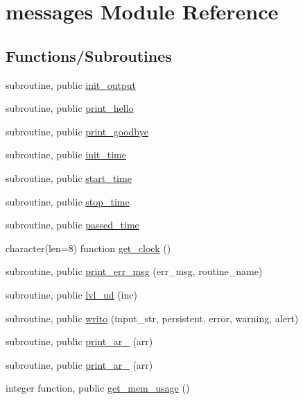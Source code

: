 \hypertarget{namespacemessages}{}\section{messages Module Reference}
\label{namespacemessages}
\subsection*{Functions/\+Subroutines}
\begin{DoxyCompactItemize}
\item 
subroutine, public \hyperlink{namespacemessages_aff8b6368cf0f8895b0f6c357df98cc21}{init\+\_\+output}
\item 
subroutine, public \hyperlink{namespacemessages_afb11646c8cb3655bdfc2f9c039851c0c}{print\+\_\+hello}
\item 
subroutine, public \hyperlink{namespacemessages_a0b3d8398d726bbf90e0c6df9f2df2c88}{print\+\_\+goodbye}
\item 
subroutine, public \hyperlink{namespacemessages_a16a1008834c161135f444d8e8e6d78d7}{init\+\_\+time}
\item 
subroutine, public \hyperlink{namespacemessages_ad997c3dff64c512e0070ce8816c28e7f}{start\+\_\+time}
\item 
subroutine, public \hyperlink{namespacemessages_a2a1154de25763d4894275ff4307b6862}{stop\+\_\+time}
\item 
subroutine, public \hyperlink{namespacemessages_aced7e14a8b4fbed8eae60217b71ca546}{passed\+\_\+time}
\item 
character(len=8) function \hyperlink{namespacemessages_a61fd0b51b5e37d58fdc993c01792a3fd}{get\+\_\+clock} ()
\item 
subroutine, public \hyperlink{namespacemessages_a0da9248828de8b7480b99b47618e8310}{print\+\_\+err\+\_\+msg} (err\+\_\+msg, routine\+\_\+name)
\item 
subroutine, public \hyperlink{namespacemessages_a6e6bfb084063e4cc91ee86e542043302}{lvl\+\_\+ud} (inc)
\item 
subroutine, public \hyperlink{namespacemessages_aa4a8d01563e92558e8a0875b075ec54c}{writo} (input\+\_\+str, persistent, error, warning, alert)
\item 
subroutine, public \hyperlink{namespacemessages_a80797cedef6112b8dccaeda431f0c610}{print\+\_\+ar\+\_} (arr)
\item 
subroutine, public \hyperlink{namespacemessages_a5686118397930f505259225f3688216b}{print\+\_\+ar\+\_} (arr)
\item 
integer function, public \hyperlink{namespacemessages_a82dddaab795b78b3d39e1ff1aab2f665}{get\+\_\+mem\+\_\+usage} ()
\end{DoxyCompactItemize}
